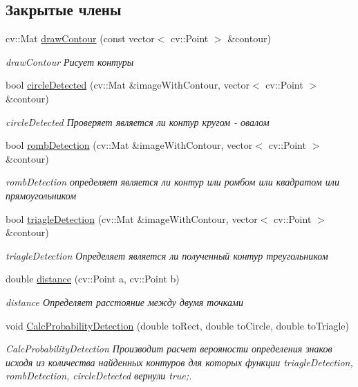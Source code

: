 \subsection*{Закрытые члены}
\begin{DoxyCompactItemize}
\item 
cv\+::\+Mat \hyperlink{class_contour_analis_a8dfbcc0a15123202d1af035f7206d87c}{draw\+Contour} (const vector$<$ cv\+::\+Point $>$ \&contour)
\begin{DoxyCompactList}\small\item\em draw\+Contour Рисует контуры \end{DoxyCompactList}\item 
bool \hyperlink{class_contour_analis_a2e67419653bf28f2bbf6766e2ffa1089}{circle\+Detected} (cv\+::\+Mat \&image\+With\+Contour, vector$<$ cv\+::\+Point $>$ \&contour)
\begin{DoxyCompactList}\small\item\em circle\+Detected Проверяет является ли контур кругом -\/ овалом \end{DoxyCompactList}\item 
bool \hyperlink{class_contour_analis_a1970e01e1762c299753c0d57f0879915}{romb\+Detection} (cv\+::\+Mat \&image\+With\+Contour, vector$<$ cv\+::\+Point $>$ \&contour)
\begin{DoxyCompactList}\small\item\em romb\+Detection определяет является ли контур или ромбом или квадратом или прямоугольником \end{DoxyCompactList}\item 
bool \hyperlink{class_contour_analis_a5c8b79c28a07825f5413cd98640d8dd2}{triagle\+Detection} (cv\+::\+Mat \&image\+With\+Contour, vector$<$ cv\+::\+Point $>$ \&contour)
\begin{DoxyCompactList}\small\item\em triagle\+Detection Определяет является ли полученный контур треугольником \end{DoxyCompactList}\item 
double \hyperlink{class_contour_analis_a4f99f88069c6a746805275d21acdf5b2}{distance} (cv\+::\+Point a, cv\+::\+Point b)
\begin{DoxyCompactList}\small\item\em distance Определяет расстояние между двумя точками \end{DoxyCompactList}\item 
void \hyperlink{class_contour_analis_a1a8b2ccb473a901f51cc21339c16c3ea}{Calc\+Probability\+Detection} (double to\+Rect, double to\+Circle, double to\+Triagle)
\begin{DoxyCompactList}\small\item\em Calc\+Probability\+Detection Производит расчет верояности определения знаков исходя из количества найденных контуров для которых функции triagle\+Detection, romb\+Detection, circle\+Detected вернули true;. \end{DoxyCompactList}\end{DoxyCompactItemize}


